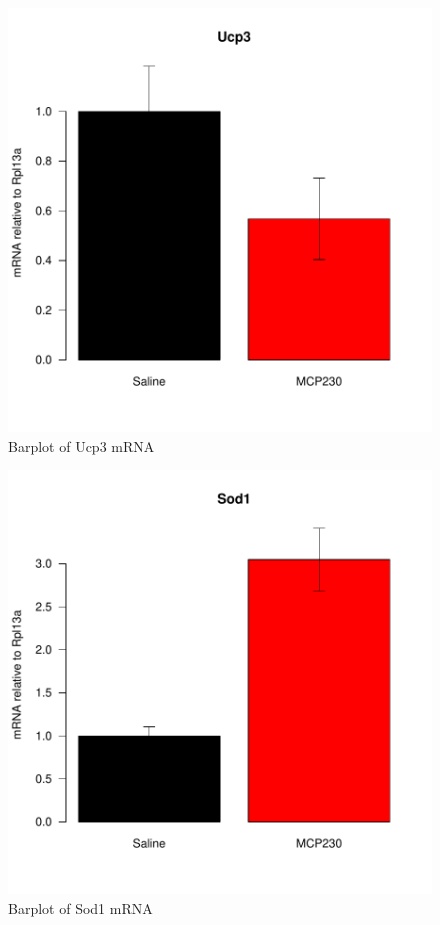 \documentclass{article}
\begin{document}
\begin{figure}
\begin{center}
\includegraphics{MaternalParticulateAntioxDefense-barplotUcp3}
\end{center}
\caption{Barplot of Ucp3 mRNA}
\label{fig:barplotUcp3}
\end{figure}

\begin{figure}
\begin{center}
\includegraphics{MaternalParticulateAntioxDefense-barplotSod1}
\end{center}
\caption{Barplot of Sod1 mRNA}
\label{fig:barplotSod1}
\end{figure}
\end{document}

